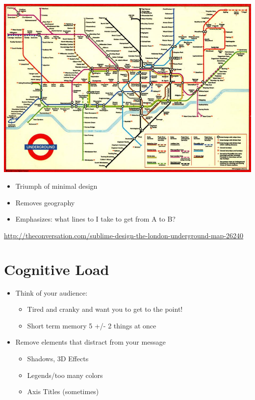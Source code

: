 \documentclass[
  letterpaper,
  DIV=11,
  numbers=noendperiod]{scrreprt}
\providecommand{\tightlist}{%
  \setlength{\itemsep}{0pt}\setlength{\parskip}{0pt}}\usepackage{longtable,booktabs,array}
\begin{document}
\includegraphics{image/london-underground.jpg}

\begin{itemize}
\tightlist
\item
  Triumph of minimal design
\item
  Removes geography
\item
  Emphasizes: what lines to I take to get from A to B?
\end{itemize}

\url{http://theconversation.com/sublime-design-the-london-underground-map-26240}

\section{Cognitive Load}\label{cognitive-load}

\begin{itemize}
\tightlist
\item
  Think of your audience:

  \begin{itemize}
  \tightlist
  \item
    Tired and cranky and want you to get to the point!
  \item
    Short term memory 5 +/- 2 things at once
  \end{itemize}
\item
  Remove elements that distract from your message

  \begin{itemize}
  \tightlist
  \item
    Shadows, 3D Effects
  \item
    Legends/too many colors
  \item
    Axis Titles (sometimes)
  \end{itemize}
\end{itemize}
\end{document}
